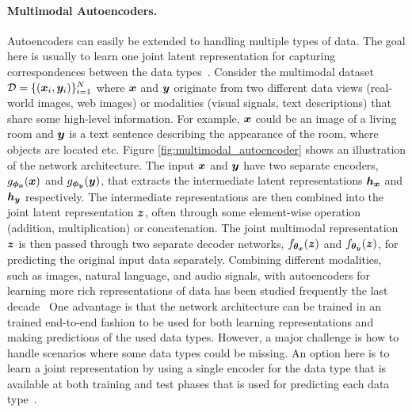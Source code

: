 \paragraph{Multimodal Autoencoders.} Autoencoders can easily be extended to handling multiple types of data. The goal here is usually to learn one joint latent representation for capturing correspondences between the data types~\cite{baltruvsaitis2018multimodal}. Consider the multimodal dataset ${\mathcal{D}} = \{({\bm{x}}_i, {\bm{y}}_i)\}_{i=1}^{N}$ where ${\bm{x}}$ and ${\bm{y}}$ originate from two different data views (real-world images, web images) or modalities (visual signals, text descriptions) that share some high-level information. For example, ${\bm{x}}$ could be an image of a living room and ${\bm{y}}$ is a text sentence describing the appearance of the room, where objects are located etc. 
Figure \ref{fig:multimodal_autoencoder} shows an illustration of the network architecture. The input ${\bm{x}}$ and ${\bm{y}}$ have two separate encoders, $g_{{\bm{\phi}}_{{\bm{x}}}}({\bm{x}})$ and $g_{{\bm{\phi}}_{{\bm{y}}}}({\bm{y}})$, that extracts the intermediate latent representations ${\bm{h}}_{{\bm{x}}}$ and ${\bm{h}}_{{\bm{y}}}$ respectively. The intermediate representations are then combined into the joint latent representation ${\bm{z}}$, often through some element-wise operation (addition, multiplication) or concatenation. The joint multimodal representation ${\bm{z}}$ is then passed through two separate decoder networks, $f_{{\bm{\theta}}_{{\bm{x}}}}({\bm{z}})$ and $f_{{\bm{\theta}}_{{\bm{y}}}}({\bm{z}})$, for predicting the original input data separately. 
Combining different modalities, such as images, natural language, and audio signals, with autoencoders for learning more rich representations of data has been studied frequently the last decade~\cite{baltruvsaitis2018multimodal,ngiam2011multimodal,wang2015deep,vedantam2017generative,wu2018multimodal,owens2018audio}
One advantage is that the network architecture can be trained in an trained end-to-end fashion to be used for both learning representations and making predictions of the used data types.
However, a major challenge is how to handle scenarios where some data types could be missing. An option here is to learn a joint representation by using a single encoder for the data type that is available at both training and test phases that is used for predicting each data type~\cite{ngiam2011multimodal}. 


